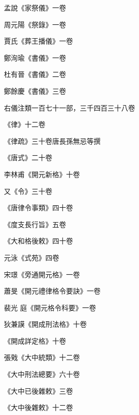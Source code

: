 \begin{pinyinscope}
 孟說《家祭儀》一卷



 周元陽《祭錄》一卷



 賈氏《葬王播儀》一卷



 鄭洵瑜《書儀》一卷



 杜有晉《書儀》二卷



 鄭餘慶《書儀》三卷



 右儀注類一百七十一部，三千四百三十八卷



 《律》十二卷



 《律疏》三十卷唐長孫無忌等撰



 《唐式》二十卷



 李林甫《開元新格》十卷



 又《令》三十卷



 《唐律令事類》四十卷



 《度支長行旨》五卷



 《大和格後敕》四十卷



 元泳《式苑》四卷



 宋璟《旁通開元格》一卷



 蕭旻《開元禮律格令要訣》一卷



 裴光
 庭《開元格令科要》一卷



 狄兼謨《開成刑法格》十卷



 《開成詳定格》十卷



 張戣《大中統類》十二卷



 《大中刑法總要》六十卷



 《大中已後雜敕》三卷



 《大中後雜敕》十二卷




\end{pinyinscope}
